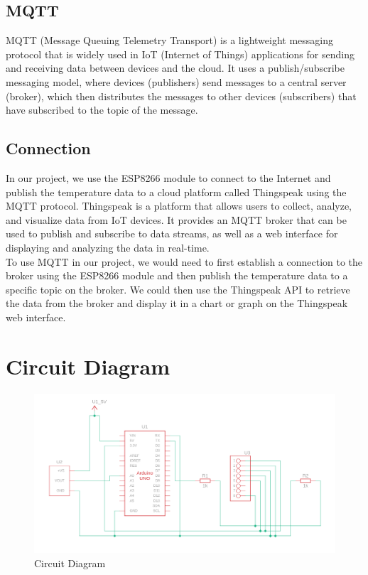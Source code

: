 \documentclass[11pt]{article}
\begin{document}
\subsection{MQTT}
MQTT (Message Queuing Telemetry Transport) is a lightweight messaging protocol that is widely used in IoT (Internet of Things) applications for sending and receiving data between devices and the cloud. It uses a publish/subscribe messaging model, where devices (publishers) send messages to a central server (broker), which then distributes the messages to other devices (subscribers) that have subscribed to the topic of the message.

\subsection{Connection}
In our project, we use the ESP8266 module to connect to the Internet and publish the temperature data to a cloud platform called Thingspeak using the MQTT protocol. Thingspeak is a platform that allows users to collect, analyze, and visualize data from IoT devices. It provides an MQTT broker that can be used to publish and subscribe to data streams, as well as a web interface for displaying and analyzing the data in real-time.\\

To use MQTT in our project, we would need to first establish a connection to the broker using the ESP8266 module and then publish the temperature data to a specific topic on the broker. We could then use the Thingspeak API to retrieve the data from the broker and display it in a chart or graph on the Thingspeak web interface.


\section{Circuit Diagram}
\begin{figure}[H]
	\centering
	\includegraphics[width=.95\textwidth]{Screenshot_on_2023-05-01_at_15-01-59.png}
	\caption{Circuit Diagram}
\end{figure}
\end{document}
